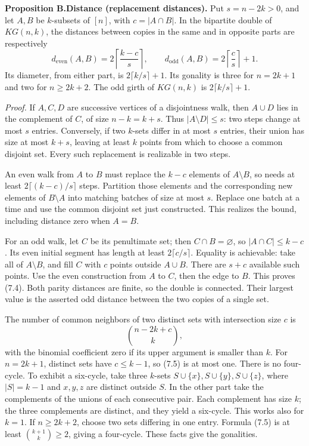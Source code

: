 \documentclass[
  11pt,
  a4paper,
]{article}
\begin{document}
\textbf{Proposition B.Distance (replacement distances).} Put
\(s=n-2k>0\), and let \(A,B\) be \(k\)-subsets of \([n]\), with
\(c=|A\cap B|\). In the bipartite double of \(KG(n,k)\), the distances
between copies in the same and in opposite parts are respectively \[
d_{\mathrm{even}}(A,B)=2\left\lceil\frac{k-c}{s}\right\rceil,
\qquad
d_{\mathrm{odd}}(A,B)=2\left\lceil\frac{c}{s}\right\rceil+1.
\tag{7.4}
\] Its diameter, from either part, is \(2\lceil k/s\rceil+1\). Its
gonality is three for \(n=2k+1\) and two for \(n\geq2k+2\). The odd
girth of \(KG(n,k)\) is \(2\lceil k/s\rceil+1\).

\emph{Proof.} If \(A,C,D\) are successive vertices of a disjointness
walk, then \(A\cup D\) lies in the complement of \(C\), of size
\(n-k=k+s\). Thus \(|A\setminus D|\leq s\): two steps change at most
\(s\) entries. Conversely, if two \(k\)-sets differ in at most \(s\)
entries, their union has size at most \(k+s\), leaving at least \(k\)
points from which to choose a common disjoint set. Every such
replacement is realizable in two steps.

An even walk from \(A\) to \(B\) must replace the \(k-c\) elements of
\(A\setminus B\), so needs at least \(2\lceil(k-c)/s\rceil\) steps.
Partition those elements and the corresponding new elements of
\(B\setminus A\) into matching batches of size at most \(s\). Replace
one batch at a time and use the common disjoint set just constructed.
This realizes the bound, including distance zero when \(A=B\).

For an odd walk, let \(C\) be its penultimate set; then
\(C\cap B=\varnothing\), so \(|A\cap C|\leq k-c\). Its even initial
segment has length at least \(2\lceil c/s\rceil\). Equality is
achievable: take all of \(A\setminus B\), and fill \(C\) with \(c\)
points outside \(A\cup B\). There are \(s+c\) available such points. Use
the even construction from \(A\) to \(C\), then the edge to \(B\). This
proves (7.4). Both parity distances are finite, so the double is
connected. Their largest value is the asserted odd distance between the
two copies of a single set.

The number of common neighbors of two distinct sets with intersection
size \(c\) is \[
\binom{n-2k+c}{k},
\tag{7.5}
\] with the binomial coefficient zero if its upper argument is smaller
than \(k\). For \(n=2k+1\), distinct sets have \(c\leq k-1\), so (7.5)
is at most one. There is no four-cycle. To exhibit a six-cycle, take
three \(k\)-sets \(S\cup\{x\},S\cup\{y\},S\cup\{z\}\), where \(|S|=k-1\)
and \(x,y,z\) are distinct outside \(S\). In the other part take the
complements of the unions of each consecutive pair. Each complement has
size \(k\); the three complements are distinct, and they yield a
six-cycle. This works also for \(k=1\). If \(n\geq2k+2\), choose two
sets differing in one entry. Formula (7.5) is at least
\(\binom{k+1}k\geq2\), giving a four-cycle. These facts give the
gonalities.
\end{document}
